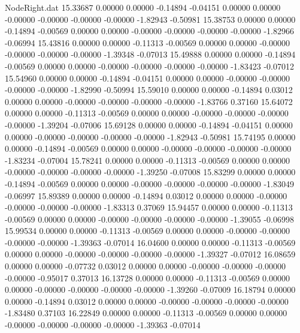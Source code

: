 \begin{filecontents}{NodeRight.dat}
  15.33687    0.00000    0.00000    -0.14894   -0.04151    0.00000    0.00000   -0.00000   -0.00000   -0.00000   -0.00000   -1.82943   -0.50981
  15.38753    0.00000    0.00000    -0.14894   -0.00569    0.00000    0.00000   -0.00000   -0.00000   -0.00000   -0.00000   -1.82966   -0.06994
  15.43816    0.00000    0.00000    -0.11313   -0.00569    0.00000    0.00000   -0.00000   -0.00000   -0.00000   -0.00000   -1.39348   -0.07013
  15.49888    0.00000    0.00000    -0.14894   -0.00569    0.00000    0.00000   -0.00000   -0.00000   -0.00000   -0.00000   -1.83423   -0.07012
  15.54960    0.00000    0.00000    -0.14894   -0.04151    0.00000    0.00000   -0.00000   -0.00000   -0.00000   -0.00000   -1.82990   -0.50994
  15.59010    0.00000    0.00000    -0.14894    0.03012    0.00000    0.00000   -0.00000   -0.00000   -0.00000   -0.00000   -1.83766    0.37160
  15.64072    0.00000    0.00000    -0.11313   -0.00569    0.00000    0.00000   -0.00000   -0.00000   -0.00000   -0.00000   -1.39204   -0.07006
  15.69128    0.00000    0.00000    -0.14894   -0.04151    0.00000    0.00000   -0.00000   -0.00000   -0.00000   -0.00000   -1.82943   -0.50981
  15.74195    0.00000    0.00000    -0.14894   -0.00569    0.00000    0.00000   -0.00000   -0.00000   -0.00000   -0.00000   -1.83234   -0.07004
  15.78241    0.00000    0.00000    -0.11313   -0.00569    0.00000    0.00000   -0.00000   -0.00000   -0.00000   -0.00000   -1.39250   -0.07008
  15.83299    0.00000    0.00000    -0.14894   -0.00569    0.00000    0.00000   -0.00000   -0.00000   -0.00000   -0.00000   -1.83049   -0.06997
  15.89389    0.00000    0.00000    -0.14894    0.03012    0.00000    0.00000   -0.00000   -0.00000   -0.00000   -0.00000   -1.83313    0.37069
  15.94457    0.00000    0.00000    -0.11313   -0.00569    0.00000    0.00000   -0.00000   -0.00000   -0.00000   -0.00000   -1.39055   -0.06998
  15.99534    0.00000    0.00000    -0.11313   -0.00569    0.00000    0.00000   -0.00000   -0.00000   -0.00000   -0.00000   -1.39363   -0.07014
  16.04600    0.00000    0.00000    -0.11313   -0.00569    0.00000    0.00000   -0.00000   -0.00000   -0.00000   -0.00000   -1.39327   -0.07012
  16.08659    0.00000    0.00000    -0.07732    0.03012    0.00000    0.00000   -0.00000   -0.00000   -0.00000   -0.00000   -0.95017    0.37013
  16.13728    0.00000    0.00000    -0.11313   -0.00569    0.00000    0.00000   -0.00000   -0.00000   -0.00000   -0.00000   -1.39260   -0.07009
  16.18794    0.00000    0.00000    -0.14894    0.03012    0.00000    0.00000   -0.00000   -0.00000   -0.00000   -0.00000   -1.83480    0.37103
  16.22849    0.00000    0.00000    -0.11313   -0.00569    0.00000    0.00000   -0.00000   -0.00000   -0.00000   -0.00000   -1.39363   -0.07014

\end{filecontents}
